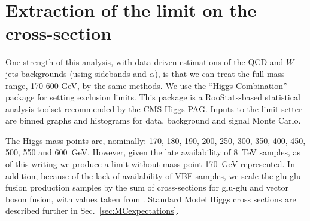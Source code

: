 \section{Extraction of the limit on the cross-section}
\label{sec:limitExtraction}

One strength of this analysis, with data-driven estimations of the QCD
and $W+$jets backgrounds (using sidebands and $\alpha$), is that we
can treat the full mass range, 170-600 GeV, by the same methods.  We
use the ``Higgs Combination'' package \cite{cite:combine} for setting
exclusion limits. This package is a RooStats\cite{cite:roostats}-based
statistical analysis toolset recommended by the CMS Higgs PAG.  Inputs
to the limit setter are binned graphs and histograms for data,
background and signal Monte Carlo.

The Higgs mass points are, nominally: 170, 180, 190, 200, 250, 300,
350, 400, 450, 500, 550 and 600~GeV. However, given the late
availability of 8~TeV samples, as of this writing we produce a limit
without mass point 170~GeV represented. In addition,
because of the lack of availability of VBF samples, we scale the
glu-glu fusion production samples by the sum of cross-sections for
glu-glu and vector boson fusion, with values taken from
\cite{cite:higgsxsecbr}.  Standard Model Higgs cross
sections are described further in Sec.~\ref{sec:MCexpectations}.


